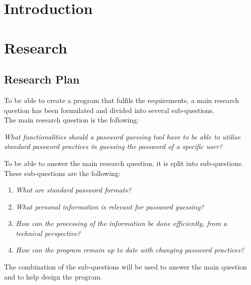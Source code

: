 \documentclass[a4paper,12pt]{article}
\begin{document}
\tableofcontents

\newpage
\section{Introduction}

\newpage

\section{Research}

\subsection{Research Plan}
\label{ch:rp}
To be able to create a program that fulfils the requirements, a main research question has been formulated and divided into several sub-questions.\\

The main research question is the following:

\vspace{0.3cm}
\textit{What functionalities should a password guessing tool have to be able to utilise standard password practices in guessing the password of a specific user?}
\vspace{0.3cm}

To be able to answer the main research question, it is split into sub-questions. These sub-questions are the following:

\vspace{0.3cm}
\begin{enumerate}
\item \textit{What are standard password formats?}
\item \textit{What personal information is relevant for password guessing?}
\item \textit{How can the processing of the information be done efficiently, from a technical perspective?}
\item \textit{How can the program remain up to date with changing password practices?}
\end{enumerate}
\vspace{0.3cm}

The combination of the sub-questions will be used to answer the main question and to help design the program.
\end{document}
